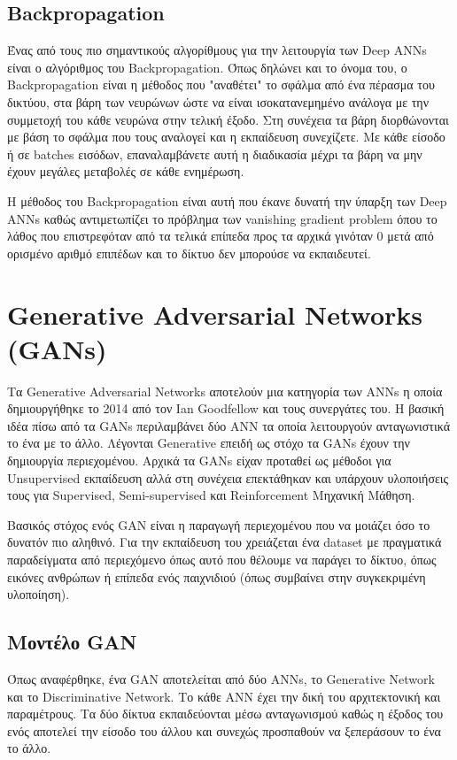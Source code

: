\subsection{Backpropagation}
Ένας από τους πιο σημαντικούς αλγορίθμους για την λειτουργία των Deep ANNs είναι ο αλγόριθμος του Backpropagation. Όπως δηλώνει και το όνομα του, ο Backpropagation είναι η μέθοδος που "αναθέτει" το σφάλμα από ένα πέρασμα του δικτύου, στα βάρη των νευρώνων ώστε να είναι ισοκατανεμημένο ανάλογα με την συμμετοχή του κάθε νευρώνα στην τελική έξοδο. Στη συνέχεια τα βάρη διορθώνονται με βάση το σφάλμα που τους αναλογεί και η εκπαίδευση συνεχίζετε. Με κάθε είσοδο ή σε batches εισόδων, επαναλαμβάνετε αυτή η διαδικασία μέχρι τα βάρη να μην έχουν μεγάλες μεταβολές σε κάθε ενημέρωση. \cite{backprop}

\par
Η μέθοδος του  Backpropagation είναι αυτή που έκανε δυνατή την ύπαρξη των Deep ANNs καθώς αντιμετωπίζει το πρόβλημα των vanishing gradient problem όπου το λάθος που επιστρεφόταν από τα τελικά επίπεδα προς τα αρχικά γινόταν 0 μετά από ορισμένο αριθμό επιπέδων και το δίκτυο δεν μπορούσε να εκπαιδευτεί.




\section{Generative Adversarial Networks (GANs)}
Τα Generative Adversarial Networks αποτελούν μια κατηγορία των ANNs η οποία δημιουργήθηκε το 2014 από τον Ian Goodfellow και τους συνεργάτες του. Η βασική ιδέα πίσω από τα GANs περιλαμβάνει δύο ANN τα οποία λειτουργούν ανταγωνιστικά το ένα με το άλλο. Λέγονται Generative επειδή ως στόχο τα GANs έχουν την δημιουργία περιεχομένου. Αρχικά τα GANs είχαν προταθεί ως μέθοδοι για Unsupervised εκπαίδευση αλλά στη συνέχεια επεκτάθηκαν και υπάρχουν υλοποιήσεις τους για Supervised, Semi-supervised και Reinforcement Μηχανική Μάθηση. 
\par
Βασικός στόχος ενός GAN είναι η παραγωγή περιεχομένου που να μοιάζει όσο το δυνατόν πιο αληθινό. Για την εκπαίδευση του χρειάζεται ένα dataset με πραγματικά παραδείγματα από περιεχόμενο όπως αυτό που θέλουμε να παράγει το δίκτυο, όπως εικόνες ανθρώπων ή επίπεδα ενός παιχνιδιού (όπως συμβαίνει στην συγκεκριμένη υλοποίηση). \cite{gan}

\subsection{Μοντέλο GAN}
Όπως αναφέρθηκε, ένα GAN αποτελείται από δύο ΑΝΝs, το Generative Network και το Discriminative Network. Το κάθε ANN έχει την δική του αρχιτεκτονική και παραμέτρους. Τα δύο δίκτυα εκπαιδεύονται μέσω ανταγωνισμού καθώς η έξοδος του ενός αποτελεί την είσοδο του άλλου και συνεχώς προσπαθούν να ξεπεράσουν το ένα το άλλο.


